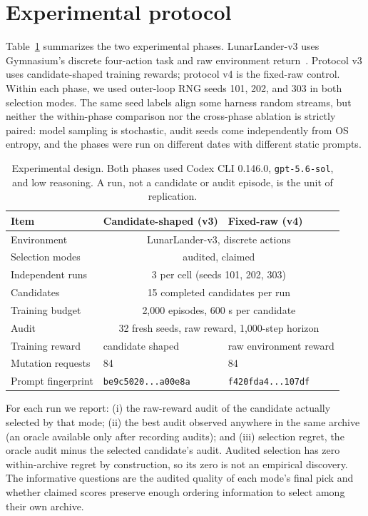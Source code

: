 \documentclass[11pt]{article}
\begin{document}
\section{Experimental protocol}
\label{sec:protocol}

Table~\ref{tab:protocol} summarizes the two experimental phases. LunarLander-v3 uses Gymnasium's
discrete four-action task and raw environment return~\citep{towers2024gymnasium}. Protocol v3
uses candidate-shaped training rewards; protocol v4 is the fixed-raw control. Within each phase,
we used outer-loop RNG seeds 101, 202, and 303 in both selection modes. The same seed labels align
some harness random streams, but neither the within-phase comparison nor the cross-phase ablation
is strictly paired: model sampling is stochastic, audit seeds come independently from OS entropy,
and the phases were run on different dates with different static prompts.

\begin{table}[t]
\centering
\small
\begin{tabular}{lll}
\toprule
Item & Candidate-shaped (v3) & Fixed-raw (v4) \\
\midrule
Environment & \multicolumn{2}{c}{LunarLander-v3, discrete actions} \\
Selection modes & \multicolumn{2}{c}{audited, claimed} \\
Independent runs & \multicolumn{2}{c}{3 per cell (seeds 101, 202, 303)} \\
Candidates & \multicolumn{2}{c}{15 completed candidates per run} \\
Training budget & \multicolumn{2}{c}{2,000 episodes, 600 s per candidate} \\
Audit & \multicolumn{2}{c}{32 fresh seeds, raw reward, 1,000-step horizon} \\
Training reward & candidate shaped & raw environment reward \\
Mutation requests & 84 & 84 \\
Prompt fingerprint & \texttt{be9c5020...a00e8a} & \texttt{f420fda4...107df} \\
\bottomrule
\end{tabular}
\caption{Experimental design. Both phases used Codex CLI 0.146.0, \texttt{gpt-5.6-sol}, and low
reasoning. A run, not a candidate or audit episode, is the unit of replication.}
\label{tab:protocol}
\end{table}

For each run we report: (i) the raw-reward audit of the candidate actually selected by that
mode; (ii) the best audit observed anywhere in the same archive (an oracle available only after
recording audits); and (iii) selection regret, the oracle audit minus the selected candidate's
audit. Audited selection has zero within-archive regret by construction, so its zero is not an
empirical discovery. The informative questions are the audited quality of each mode's final pick
and whether claimed scores preserve enough ordering information to select among their own
archive.
\end{document}
